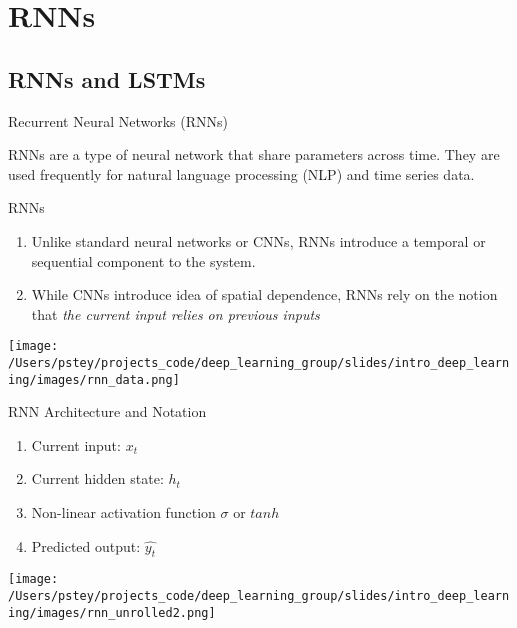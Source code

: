 \documentclass[pdf]{beamer}
\begin{document}
	
	
	
	
\section{RNNs}

\subsection{RNNs and LSTMs}

	\begin{frame}{Recurrent Neural Networks (RNNs)}

		RNNs are a type of neural network that share parameters across time. They are used frequently for natural language processing (NLP) and time series data.

	\end{frame}

	\begin{frame}{RNNs}
	\begin{enumerate}
		\item Unlike standard neural networks or CNNs, RNNs introduce a temporal or sequential component to the system.
		\item While CNNs introduce idea of spatial dependence, RNNs rely on the notion that \textit{the current input relies on previous inputs} 
	\end{enumerate}
	\begin{center}
		\texttt{[image: /Users/pstey/projects\_code/deep\_learning\_group/slides/intro\_deep\_learning/images/rnn\_data.png]}
	\end{center}
	\end{frame}


	\begin{frame}{RNN Architecture and Notation}
	\begin{enumerate}
		\item Current input: $x_t$
		\item Current hidden state: $h_t$
		\item Non-linear activation function $\sigma$ or $tanh$
		\item Predicted output: $\widehat{y_t}$
	\end{enumerate}
	
	\begin{center}
		\texttt{[image: /Users/pstey/projects\_code/deep\_learning\_group/slides/intro\_deep\_learning/images/rnn\_unrolled2.png]}
	\end{center}
	\end{frame}
	
\end{document}
